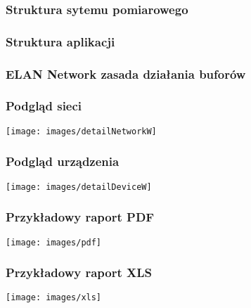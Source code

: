 \documentclass[ucs]{beamer}
\begin{document}
\begin{frame}
\frametitle{Struktura sytemu pomiarowego}

\end{frame}

\begin{frame}
\frametitle{Struktura aplikacji}
\begin{center}

\end{center}
\end{frame}

\begin{frame}
\frametitle{ELAN Network zasada działania buforów}

\end{frame}

\begin{frame}
\frametitle{Podgląd sieci}
\texttt{[image: images/detailNetworkW]}
\end{frame}

\begin{frame}
\frametitle{Podgląd urządzenia}
\texttt{[image: images/detailDeviceW]}
\end{frame}

\begin{frame}
\frametitle{Przykładowy raport PDF}
\begin{center}
\texttt{[image: images/pdf]}
\end{center}
\end{frame}

\begin{frame}
\frametitle{Przykładowy raport XLS}
\begin{center}
\texttt{[image: images/xls]}
\end{center}
\end{frame}
\end{document}
